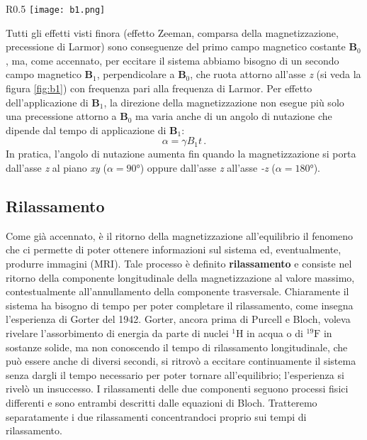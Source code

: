 \documentclass{report}
\newcommand{\figref}[1]{figura \ref{#1}}
\numberwithin{equation}{section}
\numberwithin{figure}{section}
\renewcommand{\Vec}{\bm}
\begin{document}
\begin{wrapfigure}{R}{0.5\textwidth}
    \centering
    \texttt{[image: b1.png]}
    \caption{\textit{Rappresentazione delle grandezze fisiche in gioco nella NMR}.}
    \label{fig:b1}
\end{wrapfigure}

Tutti gli effetti visti finora (effetto Zeeman, comparsa della magnetizzazione, precessione di Larmor) sono conseguenze del primo campo magnetico costante $\Vec{B}_0$, ma, come accennato, per eccitare il sistema abbiamo bisogno di un secondo campo magnetico $\Vec{B}_1$, perpendicolare a $\Vec{B}_0$, che ruota attorno all'asse \textit{z} (si veda la \figref{fig:b1}) con frequenza pari alla frequenza di Larmor. Per effetto dell'applicazione di $\Vec{B}_1$, la direzione della magnetizzazione non esegue più solo una precessione attorno a $\Vec{B}_0$ ma varia anche di un angolo di nutazione che dipende dal tempo di applicazione di $\Vec{B}_1$:
\begin{equation}
    \alpha = \gamma B_1 t\,.
\end{equation}
In pratica, l'angolo di nutazione aumenta fin quando la magnetizzazione si porta dall'asse \textit{z} al piano \textit{xy} ($\alpha = 90$°) oppure dall'asse \textit{z} all'asse \textit{-z} ($\alpha = 180$°).

\subsection{Rilassamento}
Come già accennato, è il ritorno della magnetizzazione all'equilibrio il fenomeno che ci permette di poter ottenere informazioni sul sistema ed, eventualmente, produrre immagini (MRI). Tale processo è definito \textbf{rilassamento} e consiste nel ritorno della componente longitudinale della magnetizzazione al valore massimo, contestualmente all'annullamento della componente trasversale. Chiaramente il sistema ha bisogno di tempo per poter completare il rilassamento, come insegna l'esperienza di Gorter del 1942. Gorter, ancora prima di Purcell e Bloch, voleva rivelare l'assorbimento di energia da parte di nuclei $\mathrm{^1H}$ in acqua o di $\mathrm{^{19}F}$ in sostanze solide, ma non conoscendo il tempo di rilassamento longitudinale, che può essere anche di diversi secondi, si ritrovò a eccitare continuamente il sistema senza dargli il tempo necessario per poter tornare all'equilibrio; l'esperienza si rivelò un insuccesso. I rilassamenti delle due componenti seguono processi fisici differenti e sono entrambi descritti dalle equazioni di Bloch. Tratteremo separatamente i due rilassamenti concentrandoci proprio sui tempi di rilassamento.
\end{document}
